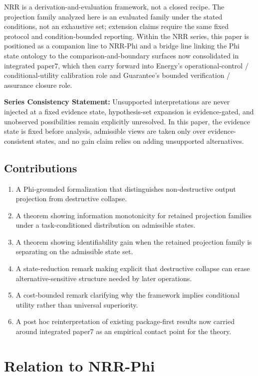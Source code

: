 \documentclass[11pt,a4paper]{article}
\begin{document}
NRR is a derivation-and-evaluation framework, not a closed recipe.
The projection family analyzed here is an evaluated family under the stated conditions, not an exhaustive set; extension claims require the same fixed protocol and condition-bounded reporting.
Within the NRR series, this paper is positioned as a companion line to NRR-Phi and a bridge line linking the Phi state ontology to the comparison-and-boundary surfaces now consolidated in integrated paper7, which then carry forward into Energy's operational-control / conditional-utility calibration role and Guarantee's bounded verification / assurance closure role.

\textbf{Series Consistency Statement:}
Unsupported interpretations are never injected at a fixed evidence state, hypothesis-set expansion is evidence-gated, and unobserved possibilities remain explicitly unresolved. In this paper, the evidence state is fixed before analysis, admissible views are taken only over evidence-consistent states, and no gain claim relies on adding unsupported alternatives.

\subsection{Contributions}

\begin{enumerate}
  \item A Phi-grounded formalization that distinguishes non-destructive output projection from destructive collapse.
  \item A theorem showing information monotonicity for retained projection families under a task-conditioned distribution on admissible states.
  \item A theorem showing identifiability gain when the retained projection family is separating on the admissible state set.
  \item A state-reduction remark making explicit that destructive collapse can erase alternative-sensitive structure needed by later operations.
  \item A cost-bounded remark clarifying why the framework implies conditional utility rather than universal superiority.
  \item A post hoc reinterpretation of existing package-first results now carried around integrated paper7 \cite{saito2026boundary} as an empirical contact point for the theory.
\end{enumerate}

\section{Relation to NRR-Phi}
\label{sec:phi}
\end{document}

